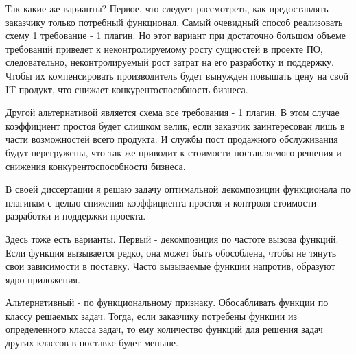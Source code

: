 Так какие же варианты? Первое, что следует рассмотреть, как предоставлять заказчику только потребный функционал. Самый очевидный способ реализовать схему 1 требование - 1 плагин. Но этот вариант при достаточно большом объеме требований приведет к неконтролируемому росту сущностей в проекте ПО, следовательно, неконтролируемый рост затрат на его разработку и поддержку. Чтобы их компенсировать производитель будет вынужден повышать цену на свой IT продукт, что снижает конкурентоспособность бизнеса.

Другой альтернативой является схема все требования - 1 плагин. В этом случае коэффициент простоя будет слишком велик, если заказчик заинтересован лишь в части возможностей всего продукта. И службы пост продажного обслуживания будут перегружены, что так же приводит к стоимости поставляемого решения и снижения конкурентоспособности бизнеса.

В своей диссертации я решаю задачу оптимальной декомпозиции функционала по плагинам с целью снижения коэффициента простоя и контроля стоимости разработки и поддержки проекта.

Здесь тоже есть варианты. Первый - декомпозиция по частоте вызова функций. Если функция вызывается редко, она может быть обособлена, чтобы не тянуть свои зависимости в поставку. Часто вызываемые функции напротив, образуют ядро приложения.

Альтернативный - по функциональному признаку. Обосабливать функции по классу решаемых задач. Тогда, если заказчику потребены функции из определенного класса задач, то ему количество функций для решения задач других классов в поставке будет меньше.